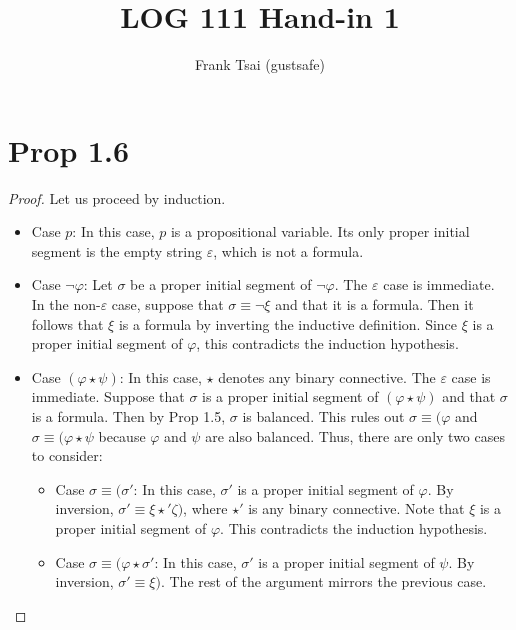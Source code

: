 \documentclass[a4paper]{article}
\title{LOG 111 Hand-in 1}
\author{Frank Tsai (gustsafe)}
\begin{document}
\maketitle

\section{Prop 1.6}
\begin{proof}
  Let us proceed by induction.
  \begin{itemize}
  \item Case $p$: In this case, $p$ is a propositional variable.
    Its only proper initial segment is the empty string $\varepsilon$, which is not a formula.

  \item Case $\lnot\varphi$: Let $\sigma$ be a proper initial segment of $\lnot\varphi$.
    The $\varepsilon$ case is immediate.
    In the non-$\varepsilon$ case, suppose that $\sigma \equiv \lnot\xi$ and that it is a formula.
    Then it follows that $\xi$ is a formula by inverting the inductive definition.
    Since $\xi$ is a proper initial segment of $\varphi$, this contradicts the induction hypothesis.

  \item Case $(\varphi \star \psi)$: In this case, $\star$ denotes any binary connective.
    The $\varepsilon$ case is immediate.
    Suppose that $\sigma$ is a proper initial segment of $(\varphi \star \psi)$ and that $\sigma$ is a formula.
    Then by Prop 1.5, $\sigma$ is balanced.
    This rules out $\sigma \equiv (\varphi$ and $\sigma \equiv (\varphi \star \psi$ because $\varphi$ and $\psi$ are also balanced.
    Thus, there are only two cases to consider:
    \begin{itemize}
    \item Case $\sigma \equiv (\sigma'$: In this case, $\sigma'$ is a proper initial segment of $\varphi$.
      By inversion, $\sigma' \equiv \xi \star' \zeta)$, where $\star'$ is any binary connective.
      Note that $\xi$ is a proper initial segment of $\varphi$.
      This contradicts the induction hypothesis.
    \item Case $\sigma \equiv (\varphi \star \sigma'$: In this case, $\sigma'$ is a proper initial segment of $\psi$.
      By inversion, $\sigma' \equiv \xi)$.
      The rest of the argument mirrors the previous case. \qedhere
    \end{itemize}
  \end{itemize}
\end{proof}
\end{document}
